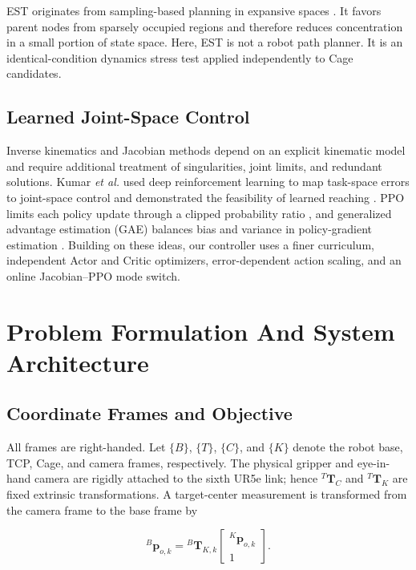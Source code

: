 \documentclass[conference]{IEEEtran}
\begin{document}
EST originates from sampling-based planning in expansive spaces \cite{ref7}. It favors parent nodes from sparsely occupied regions and therefore reduces concentration in a small portion of state space. Here, EST is not a robot path planner. It is an identical-condition dynamics stress test applied independently to Cage candidates.

\subsection{Learned Joint-Space Control}

Inverse kinematics and Jacobian methods depend on an explicit kinematic model and require additional treatment of singularities, joint limits, and redundant solutions. Kumar \emph{et al.} used deep reinforcement learning to map task-space errors to joint-space control and demonstrated the feasibility of learned reaching \cite{ref4}. PPO limits each policy update through a clipped probability ratio \cite{ref5}, and generalized advantage estimation (GAE) balances bias and variance in policy-gradient estimation \cite{ref8}. Building on these ideas, our controller uses a finer curriculum, independent Actor and Critic optimizers, error-dependent action scaling, and an online Jacobian--PPO mode switch.

\section{Problem Formulation And System Architecture}

\subsection{Coordinate Frames and Objective}

All frames are right-handed. Let \(\{B\}\), \(\{T\}\), \(\{C\}\), and \(\{K\}\) denote the robot base, TCP, Cage, and camera frames, respectively. The physical gripper and eye-in-hand camera are rigidly attached to the sixth UR5e link; hence \({}^{T}\mathbf{T}_{C}\) and \({}^{T}\mathbf{T}_{K}\) are fixed extrinsic transformations. A target-center measurement is transformed from the camera frame to the base frame by

\begin{equation}
{}^{B}\mathbf{p}_{o,k}={}^{B}\mathbf{T}_{K,k}
\begin{bmatrix}{}^{K}\mathbf{p}_{o,k}\\1\end{bmatrix}.

\end{equation}
\end{document}
